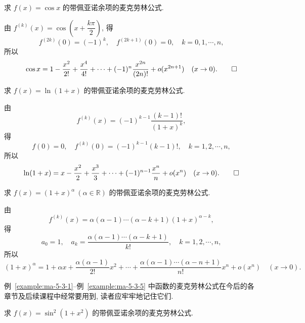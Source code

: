 \begin{example}\label{example:ma-5-3-3}
求 $f(x)=\cos x$ 的带佩亚诺余项的麦克劳林公式.
\end{example}


\begin{solve}
由 $f^{(k)}(x)=\cos\left(x+\dfrac{k\pi}{2}\right)$, 得
\[
  f^{(2k)}(0)=(-1)^k,\quad f^{(2k+1)}(0)=0,\quad k=0,1,\cdots,n,
\]
所以
\[
  \cos x=1-\frac{x^2}{2!}+\frac{x^4}{4!}+\cdots+(-1)^n\frac{x^{2n}}{(2n)!}+o(x^{2n+1})\quad (x\to0).
\qedhere
\]
\end{solve}


\begin{example}\label{example:ma-5-3-4}
求 $f(x)=\ln(1+x)$ 的带佩亚诺余项的麦克劳林公式.
\end{example}


\begin{solve}
由
\[
  f^{(k)}(x)=(-1)^{k-1}\frac{(k-1)!}{(1+x)^k},
\]
得
\[
  f(0)=0,\quad f^{(k)}(0)=(-1)^{k-1}(k-1)!,\quad k=1,2,\cdots,n,
\]
所以
\[
  \ln(1+x)=x-\frac{x^2}{2}+\frac{x^3}{3}+\cdots+(-1)^{n-1}\frac{x^n}{n}+o(x^n)\quad (x\to0).
\qedhere
\]
\end{solve}


\begin{example}\label{example:ma-5-3-5}
求 $f(x)=(1+x)^\alpha\ (\alpha\in\mathbb{R})$ 的带佩亚诺余项的麦克劳林公式.
\end{example}


\begin{solve}
由
\[
  f^{(k)}(x)=\alpha(\alpha-1)\cdots(\alpha-k+1)(1+x)^{\alpha-k},
\]
得
\[
  a_0=1,\quad
  a_k=\frac{\alpha(\alpha-1)\cdots(\alpha-k+1)}{k!},\quad k=1,2,\cdots,n,
\]
所以
\[
  (1+x)^\alpha
  =
  1+\alpha x+\frac{\alpha(\alpha-1)}{2!}x^2+\cdots
  +\frac{\alpha(\alpha-1)\cdots(\alpha-n+1)}{n!}x^n+o(x^n)
  \quad (x\to0).
\]

例~\ref{example:ma-5-3-1}--例~\ref{example:ma-5-3-5} 中函数的麦克劳林公式在今后的各章节及后续课程中经常要用到, 读者应牢牢地记住它们.
\end{solve}


\begin{example}\label{example:ma-5-3-6}
求 $f(x)=\sin^2(1+x^2)$ 的带佩亚诺余项的麦克劳林公式.
\end{example}


